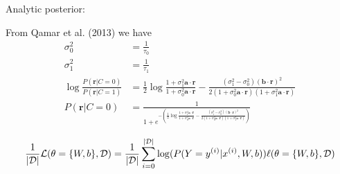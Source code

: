 \documentclass[12pt]{article}
\begin{document}
Analytic posterior:

From Qamar et al. (2013) we have
\begin{equation}
\begin{aligned}
\sigma_0^2 &= \frac{1}{\tau_0}\\
\sigma_1^2 &= \frac{1}{\tau_1}\\
\log \frac{P(\mathbf{r}|C = 0)}{P(\mathbf{r}|C = 1)} &= \frac{1}{2} \log \frac{1 + \sigma_1^2 \mathbf{a} \cdot \mathbf{r}}{1 + \sigma_0^2\mathbf{a} \cdot \mathbf{r}} - \frac{(\sigma_1^2 - \sigma_0^2)(\mathbf{b} \cdot \mathbf{r})^2}{2 (1 + \sigma_0^2 \mathbf{a} \cdot \mathbf{r})(1 + \sigma_1^2 \mathbf{a} \cdot \mathbf{r})}\\
P(\mathbf{r}|C = 0) &= \frac{1}{1 + e^{-(\frac{1}{2} \log \frac{1 + \sigma_1^2 \mathbf{a} \cdot \mathbf{r}}{1 + \sigma_0^2\mathbf{a} \cdot \mathbf{r}} - \frac{(\sigma_1^2 - \sigma_0^2)(\mathbf{b} \cdot \mathbf{r})^2}{2 (1 + \sigma_0^2 \mathbf{a} \cdot \mathbf{r})(1 + \sigma_1^2 \mathbf{a} \cdot \mathbf{r})})}}
\end{aligned}
\end{equation}

\begin{equation}
\frac{1}{|\mathcal{D}|} \mathcal{L} (\theta=\{W,b\}, \mathcal{D}) =
                \frac{1}{|\mathcal{D}|} \sum_{i=0}^{|\mathcal{D}|}
                    \log(P(Y=y^{(i)}|x^{(i)}, W,b)) \\
                \ell (\theta=\{W,b\}, \mathcal{D})
\end{equation}
\end{document}
